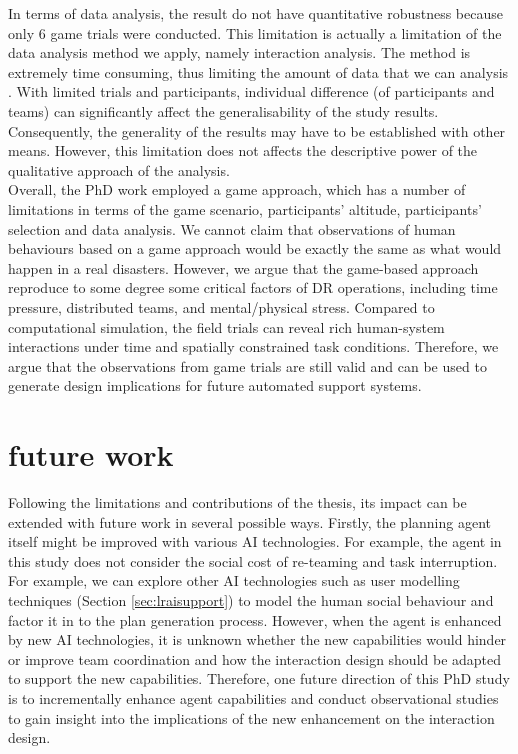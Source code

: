 In terms of data analysis, the result do not have quantitative robustness because only 6 game trials were conducted. This limitation is actually a limitation of the data analysis method we apply, namely interaction analysis. The method is extremely time consuming, thus limiting the amount of data that we can analysis \cite{Crabtree2012}. With limited trials and participants, individual difference (of participants and teams) can significantly affect the generalisability of the study results. Consequently, the generality of the results may have to be established with other means. However, this limitation does not affects the descriptive power of the qualitative approach of the analysis. \\

Overall, the PhD work employed a game approach, which has a number of limitations in terms of the game scenario, participants' altitude, participants' selection and data analysis. We cannot claim that observations of human behaviours based on a game approach would be exactly the same as what would happen in a real disasters. However, we argue that the game-based approach reproduce to some degree some critical factors of \ac{DR} operations, including time pressure, distributed teams, and mental/physical stress. Compared to computational simulation, the field trials can reveal rich human-system interactions under time and spatially constrained task conditions. Therefore, we argue that the observations from game trials are still valid and can be used to generate design implications for future automated support systems. \\


\section{future work}
Following the limitations and contributions of the thesis, its impact can be extended with future work in several possible ways. Firstly, the planning agent itself might be improved with various AI technologies. For example, the agent in this study does not consider the social cost of re-teaming and task interruption. For example, we can explore other AI technologies such as user modelling techniques (Section \ref{sec:lraisupport}) to model the human social behaviour and factor it in to the plan generation process.  However, when the agent is enhanced by new AI technologies, it is unknown whether the new capabilities would hinder or improve team coordination and how the interaction design should be adapted to support the new capabilities. Therefore, one future direction of this PhD study is to incrementally enhance agent capabilities and conduct observational studies to gain insight into the implications of the new enhancement on the interaction design.\\

